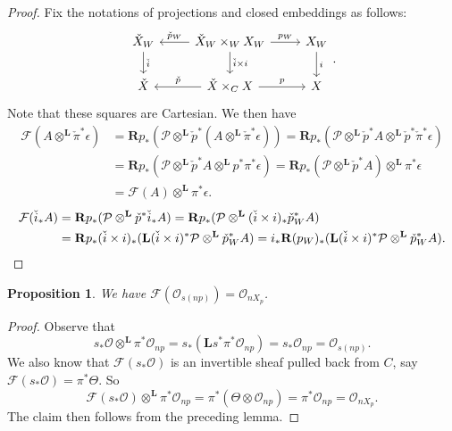 \documentclass{amsart}
\theoremstyle{plain}
\newtheorem{proposition}[theorem]{Proposition}
\theoremstyle{definition}
\theoremstyle{remark}
\begin{document}
    \begin{proof}
        Fix the notations of projections and closed embeddings as follows:
        \[
        \begin{tikzcd}
            \check{X}_W\arrow{d}{\check{i}}& \check{X}_W\times_WX_W\arrow{r}{p_W}\arrow[swap]{l}{\check{p}_W}\arrow{d}{\check{i}\times i}&X_W\arrow{d}{i}\\
            \check{X}& \check{X}\times_CX\arrow{r}{p}\arrow[swap]{l}{\check{p}}&X
        \end{tikzcd}.
        \]
        Note that these squares are Cartesian.
        We then have
        \begin{align*}
            \mathcal F(A\otimes^{\mathbf L}\check\pi^\ast\epsilon)&=\mathbf Rp_\ast(\mathcal P\otimes^{\mathbf L}\check{p}^\ast(A\otimes^{\mathbf L}\check\pi^\ast\epsilon))=\mathbf Rp_\ast(\mathcal P\otimes^{\mathbf L}\check{p}^\ast A\otimes^{\mathbf L}\check{p}^\ast\check\pi^\ast\epsilon)\\
            &=\mathbf Rp_\ast(\mathcal P\otimes^{\mathbf L}\check{p}^\ast A\otimes^{\mathbf L}p^\ast\pi^\ast\epsilon)=\mathbf Rp_\ast(\mathcal P\otimes^{\mathbf L}\check{p}^\ast A)\otimes^{\mathbf L}\pi^\ast\epsilon\\
            &=\mathcal F(A)\otimes^{\mathbf L}\pi^\ast\epsilon.
        \end{align*}
        \begin{align*}
            \mathcal F(\check{i}_\ast A)&=\mathbf Rp_\ast(\mathcal P\otimes^{\mathbf L}\check{p}^\ast\check{i}_\ast A)=\mathbf Rp_\ast(\mathcal P\otimes^{\mathbf L}(\check{i}\times i)_\ast\check{p}_W^\ast A)\\
            &=\mathbf Rp_\ast(\check{i}\times i)_\ast(\mathbf L(\check{i}\times i)^\ast\mathcal P\otimes^{\mathbf L}\check{p}_W^\ast A)=i_\ast\mathbf R(p_W)_\ast(\mathbf L(\check{i}\times i)^\ast\mathcal P\otimes^{\mathbf L}\check{p}_W^\ast A).\qedhere
        \end{align*}
    \end{proof}
    \begin{proposition}\label{section_of_fibration}
        We have $\mathcal F(\mathcal O_{s(np)})=\mathcal O_{nX_p}$.
    \end{proposition}
    \begin{proof}
        Observe that
        \[s_\ast\mathcal O\otimes^{\mathbf L}\pi^\ast\mathcal O_{np}=s_\ast(\mathbf Ls^\ast\pi^\ast\mathcal O_{np})=s_\ast\mathcal O_{np}=\mathcal O_{s(np)}.\]
        We also know that $\mathcal F(s_\ast\mathcal O)$ is an invertible sheaf pulled back from $C$, say $\mathcal F(s_\ast\mathcal O)=\pi^\ast \Theta$.
        So
        \[\mathcal F(s_\ast\mathcal O)\otimes^{\mathbf L}\pi^\ast\mathcal O_{np}=\pi^\ast(\Theta\otimes\mathcal O_{np})=\pi^\ast\mathcal O_{np}=\mathcal O_{nX_p}.\]
        The claim then follows from the preceding lemma.
    \end{proof}
\end{document}
